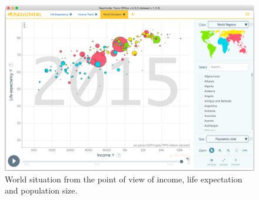 \begin{figure}[h]
	\centering
	\includegraphics[width=0.95\columnwidth]{figures/world-situation}
	\caption{World situation from the point of view of income, life expectation and population size.}
	\label{fig:world-situation}
\end{figure}
